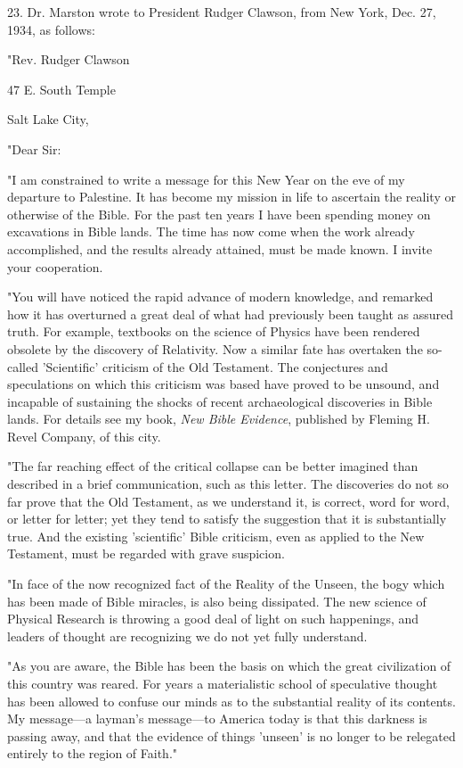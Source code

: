 23. Dr. Marston wrote to President Rudger Clawson, from New York, Dec. 27, 1934, as
follows:

"Rev. Rudger Clawson

47 E. South Temple

Salt Lake City,

"Dear Sir:

"I am constrained to write a message for this New Year on the eve of my departure to
Palestine. It has become my mission in life to ascertain the reality or otherwise of the Bible.
For the past ten years I have been spending money on excavations in Bible lands. The time
has now come when the work already accomplished, and the results already attained, must be
made known. I invite your cooperation.

"You will have noticed the rapid advance of modern knowledge, and remarked how it has
overturned a great deal of what had previously been taught as assured truth. For example,
textbooks on the science of Physics have been rendered obsolete by the discovery of
Relativity. Now a similar fate has overtaken the so-called 'Scientific' criticism of the Old
Testament. The conjectures and speculations on which this criticism was based have proved
to be unsound, and incapable of sustaining the shocks of recent archaeological discoveries in
Bible lands. For details see my book, \textit{New Bible Evidence}, published by Fleming H. Revel
Company, of this city.

"The far reaching effect of the critical collapse can be better imagined than described in a
brief communication, such as this letter. The discoveries do not so far prove that the Old
Testament, as we understand it, is correct, word for word, or letter for letter; yet they tend to
satisfy the suggestion that it is substantially true. And the existing 'scientific' Bible criticism,
even as applied to the New Testament, must be regarded with grave suspicion.

"In face of the now recognized fact of the Reality of the Unseen, the bogy which has been
made of Bible miracles, is also being dissipated. The new science of Physical Research is
throwing a good deal of light on such happenings, and leaders of thought are recognizing we
do not yet fully understand.

"As you are aware, the Bible has been the basis on which the great civilization of this country
was reared. For years a materialistic school of speculative thought has been allowed to
confuse our minds as to the substantial reality of its contents. My message—a layman's
message—to America today is that this darkness is passing away, and that the evidence of
things 'unseen' is no longer to be relegated entirely to the region of Faith."


